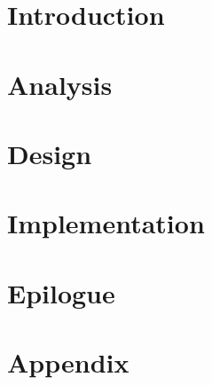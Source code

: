 
\raggedbottom


	
	\frontmatter
	
	
	
	\setlength\parskip{0ex}
	\tableofcontents*
	\setlength{\parskip}{3mm}
	
	\newpage
	
	\mainmatter
	
	\newpage
	\listoffixmes
	
	\part{Introduction}
		
	\part{Analysis}

	\part{Design}

	\part{Implementation}

	\part{Epilogue}
	
	
	\begingroup
		\raggedright
		
	\endgroup
	
	
	
	 \clearforchapter
	 \part*{Appendix}
	 \appendix
	 
	
	
%	
	

